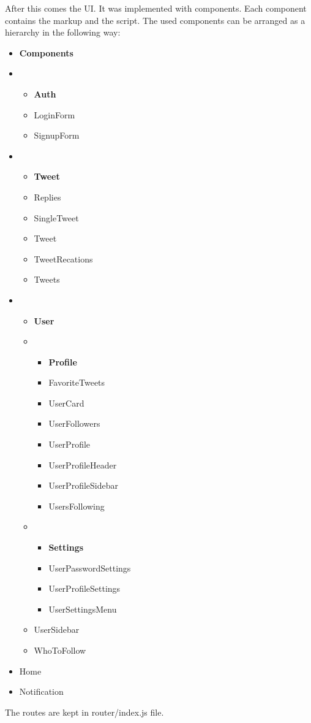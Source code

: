 	After this comes the UI. It was implemented with components. Each component contains the markup and the script. The used components can be arranged as a hierarchy in the following way:
	\begin{itemize}
		\item \textbf{Components}
		\item \begin{itemize}
			      \item \textbf{Auth}
			      \item LoginForm
			      \item SignupForm				
	   		  \end{itemize}
   		\item \begin{itemize}
   		          \item \textbf{Tweet}
   		          \item Replies
   		          \item SingleTweet
   		          \item Tweet
   		          \item TweetRecations
   		          \item Tweets
   			  \end{itemize}
   		\item \begin{itemize}
	   			  \item \textbf{User}
  	   			  \item \begin{itemize}
  	   			  	        \item \textbf{Profile}
  	   			  	        \item FavoriteTweets
  	   			  	        \item UserCard
  	   			  	        \item UserFollowers
  	   			  	        \item UserProfile
  	   			  	        \item UserProfileHeader
  	   			  	        \item UserProfileSidebar
  	   			  	        \item UsersFollowing    
  	   			        \end{itemize}  
	   			  \item \begin{itemize}
							\item \textbf{Settings}
							\item UserPasswordSettings
							\item UserProfileSettings
							\item UserSettingsMenu	
	        	   	    \end{itemize}
	   			  \item UserSidebar
	   			  \item WhoToFollow
	   		\end{itemize}
   		\item Home
   		\item Notification  
	\end{itemize}

	The routes are kept in router/index.js file.
\clearpage